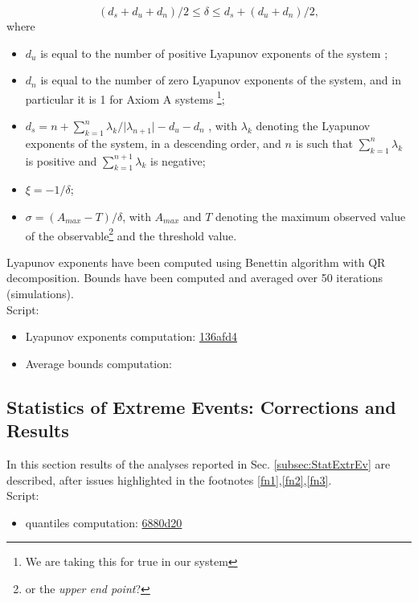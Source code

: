 \documentclass{article}
\begin{document}
\begin{equation}
\left(d_s +d_u + d_n\right)/2 \leq \delta \leq d_s + \left(d_u + d_n\right)/2,  
\end{equation}
where
\begin{itemize}
	\item $d_u$ is equal to the number of positive Lyapunov exponents of the system \cite{Ott};
	\item $d_n$ is equal to the number of zero Lyapunov exponents of the system, and in particular it is 1 for Axiom A systems \footnote{We are taking this for true in our system};
	\item $d_s = n + \sum_{k=1}^n \lambda_k / \vert \lambda_{n+1} \vert - d_u - d_n$ \cite{Galfi}, with $\lambda_k$ denoting the Lyapunov exponents of the system, in a descending order, and $n$ is such that $\sum_{k=1}^n \lambda_k$ is positive and $\sum_{k=1}^{n+1} \lambda_k$ is negative;
	\item $\xi = -1/\delta$;
	\item $\sigma = \left( A_{max} - T\right)/\delta$, with $A_{max}$ and $T$ denoting the maximum observed value of the observable\footnote{or the \textit{upper end point}?} and the threshold value.
\end{itemize}

Lyapunov exponents have been computed using Benettin algorithm with QR decomposition. Bounds have been computed and averaged over 50 iterations (simulations).
\\Script:
\begin{itemize}
	\item Lyapunov exponents computation: \href{https://github.com/marco-cucchi/L96gev/commit/136afd42b03778e04fe515e517c3e63c406b2043#diff-2a3c128ef27f1e284787331bae1833ea}{136afd4}
	\item Average bounds computation:
	
\end{itemize}

\subsection{Statistics of Extreme Events: Corrections and Results}

In this section results of the analyses reported in Sec. \ref{subsec:StatExtrEv} are described, after issues highlighted in the footnotes \ref{fn1},\ref{fn2},\ref{fn3}.
\\Script:
\begin{itemize}
	\item quantiles computation: \href{https://github.com/marco-cucchi/L96gev/commit/6880d207820a5b5919b3bbd0a034782f34c7bb49#diff-3b01235fe20ba4105fab7b053c2dadfb}{6880d20}
\end{itemize}
\end{document}
